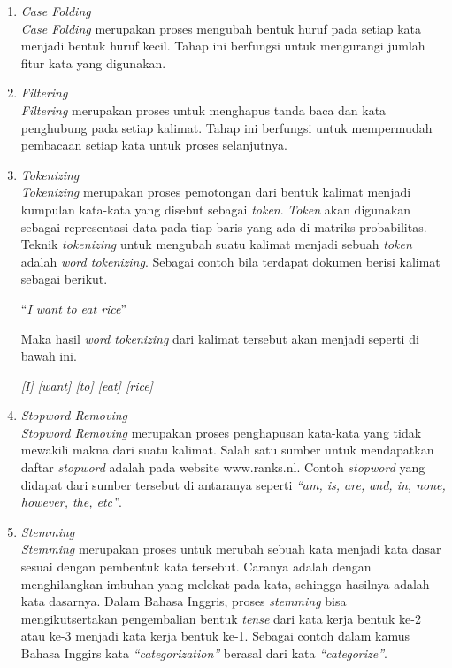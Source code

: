 \begin{enumerate}[nolistsep,leftmargin=0.5cm]
\item
{\itshape Case Folding}\\
{\itshape Case Folding} merupakan proses mengubah bentuk huruf pada setiap kata menjadi bentuk huruf kecil. Tahap ini berfungsi untuk mengurangi jumlah fitur kata yang digunakan.
\item
{\itshape Filtering}\\
{\itshape Filtering} merupakan proses untuk menghapus tanda baca dan kata penghubung pada setiap kalimat. Tahap ini berfungsi untuk mempermudah pembacaan setiap kata untuk proses selanjutnya.
\item
{\itshape Tokenizing}\\
{\itshape Tokenizing} merupakan proses pemotongan dari bentuk kalimat menjadi kumpulan kata-kata yang disebut sebagai {\itshape token}. {\itshape Token} akan digunakan sebagai representasi data pada tiap baris yang ada di matriks probabilitas. Teknik {\itshape tokenizing} untuk mengubah suatu kalimat menjadi sebuah {\itshape token} adalah {\itshape word tokenizing}.  Sebagai contoh bila terdapat dokumen berisi kalimat sebagai berikut.

\begin{center}
“{\itshape I want to eat rice}”
\end{center}

Maka hasil {\itshape word tokenizing} dari kalimat tersebut akan menjadi seperti di bawah ini.

\begin{center}
{\itshape [I] [want] [to] [eat] [rice]}
\end{center}

\item
{\itshape Stopword Removing}\\
{\itshape Stopword Removing} merupakan proses penghapusan kata-kata yang tidak mewakili makna dari suatu kalimat. Salah satu sumber untuk mendapatkan daftar {\itshape stopword} adalah pada website www.ranks.nl. Contoh {\itshape stopword} yang didapat dari sumber tersebut di antaranya seperti {\itshape “am, is, are, and, in, none, however, the, etc”}.

\item
{\itshape Stemming}\\
{\itshape Stemming} merupakan proses untuk merubah sebuah kata menjadi kata dasar sesuai dengan pembentuk kata tersebut. Caranya adalah dengan menghilangkan imbuhan yang melekat pada kata, sehingga hasilnya adalah kata dasarnya. Dalam Bahasa Inggris, proses {\itshape stemming} bisa mengikutsertakan pengembalian bentuk {\itshape tense} dari kata kerja bentuk ke-2 atau ke-3 menjadi kata kerja bentuk ke-1. Sebagai contoh dalam kamus Bahasa Inggirs kata {\itshape “categorization”} berasal dari kata {\itshape “categorize”}.
\end{enumerate}

